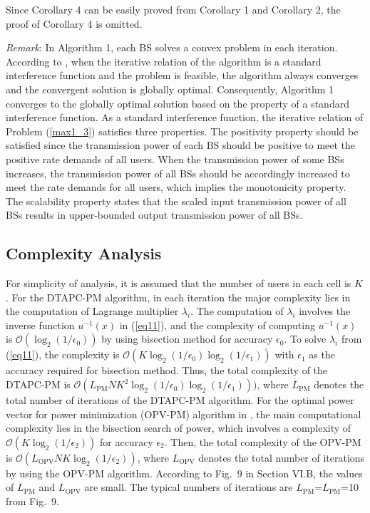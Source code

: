 \documentclass[journal]{IEEEtran}
\begin{document}
Since Corollary 4 can be easily proved from Corollary 1 and Corollary 2, the proof of Corollary 4 is omitted.

\textit{Remark}: In Algorithm 1, each BS solves a convex problem in each iteration.
According to \cite{yates1995framework}, when the iterative relation of the algorithm is a standard interference function and the problem is feasible, the algorithm always converges and the convergent solution is globally optimal.
Consequently, Algorithm 1 converges to the globally optimal solution based on the property of a standard interference function.
As a standard interference function, the iterative relation of Problem (\ref{max1_3}) satisfies three properties.
The positivity property should be satisfied since the transmission power of each BS should be positive to meet the positive rate demands of all users.
When the transmission power of some BSs increases, the transmission power of all BSs should be accordingly increased to meet the rate demands for all users, which implies the monotonicity property.
The scalability property states that the scaled input transmission power of all BSs results in upper-bounded output transmission power of all BSs.

\subsection{Complexity Analysis}
\label{companapm}
For simplicity of analysis, it is assumed that the number of users in each cell is $K$.
For the DTAPC-PM algorithm, in each iteration the major complexity lies in the computation of Lagrange multiplier $\lambda_i$.
The computation of $\lambda_i$ involves the inverse function $u^{-1}(x)$ in (\ref{eq11}),
and the complexity of computing $u^{-1}(x)$
is $\mathcal O(\log_2(1/\epsilon_0))$ by using bisection method for accuracy $\epsilon_0$.
To solve $\lambda_i$ from (\ref{eq11}), the complexity is $\mathcal O(K  \log_2(1/\epsilon_0)\log_2(1/\epsilon_1))$ with $\epsilon_1$ as the accuracy required for bisection method.
Thus, the total complexity of the DTAPC-PM is $\mathcal O(L_{\text{PM}}NK^2 \log_2(1/\epsilon_0)\log_2(1/\epsilon_1)) )$, where $L_{\text{PM}}$ denotes the total number of iterations of the DTAPC-PM algorithm.
For the optimal power vector for power minimization (OPV-PM) algorithm in \cite{Chin2015Power}, the main computational complexity lies in the bisection search of power, which involves a complexity of $\mathcal O(K \log_2(1/\epsilon_2))$ for accuracy $\epsilon_2$.
Then, the total complexity of the OPV-PM is $\mathcal O(L_{\text{OPV}}NK  \log_2(1/\epsilon_2))$, where $L_{\text{OPV}}$ denotes the total number of iterations by using the OPV-PM algorithm.
According to Fig.~9 in Section VI.B, the values of $L_{\text{PM}}$ and $L_{\text{OPV}}$ are small. The typical numbers of iterations are $L_{\text{PM}}$=$L_{\text{PM}}$=10 from Fig.~9.
\end{document}
